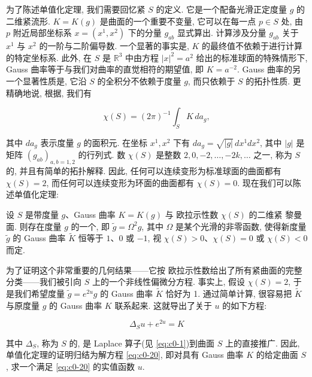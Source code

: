 为了陈述单值化定理, 我们需要回忆紧 $S$ 的定义.
它是一个配备光滑正定度量 $g$ 的二维紧流形.
 $K = K(g)$ 是曲面的一个重要不变量, 它可以在每一点 $p \in S$ 处, 由 $p$ 附近局部坐标系 $x = (x^{1}, x^{2})$ 下的分量 $g_{a b}$ 显式算出.
计算涉及分量 $g_{a b}$ 关于 $x^{1}$ 与 $x^{2}$ 的一阶与二阶偏导数.
一个显著的事实是, $K$ 的最终值不依赖于进行计算的特定坐标系.
此外, 在 $S$ 是 $\mathbb{R}^{3}$ 中由方程 $|x|^{2} = a^{2}$ 给出的标准球面的特殊情形下, Gauss 曲率等于与我们对曲率的直觉相符的期望值, 即 $K = a^{-2}$.
Gauss 曲率的另一个显著性质是, 它沿 $S$ 的全积分不依赖于度量 $g$, 而只依赖于 $S$ 的拓扑性质.
更精确地说, 根据, 我们有

\[
\chi(S) = (2 \pi)^{-1} \int_{S} K \, d a_{g},
\]

其中 $d a_{g}$ 表示度量 $g$ 的面积元.
在坐标 $x^{1}, x^{2}$ 下有 $d a_{g} = \sqrt{|g|}\, d x^{1} d x^{2}$, 其中 $|g|$ 是矩阵 $(g_{a b})_{a, b = 1, 2}$ 的行列式.
数 $\chi(S)$ 是整数 $2, 0, -2, \ldots, -2 k, \ldots$ 之一, 称为 $S$ 的, 并且有简单的拓扑解释.
因此, 任何可以连续变形为标准球面的曲面都有 $\chi(S) = 2$, 而任何可以连续变形为环面的曲面都有 $\chi(S) = 0$.
现在我们可以陈述单值化定理:

\begin{theorem}\label{thm:c0-1.1}
设 $S$ 是带度量 $g$、Gauss 曲率 $K = K(g)$ 与 欧拉示性数 $\chi(S)$ 的二维紧 黎曼面.
则存在度量 $g$ 的一个, 即 $\tilde{g} = \Omega^{2} g$, 其中 $\Omega$ 是某个光滑的非零函数, 使得新度量 $\tilde{g}$ 的 Gauss 曲率 $\tilde{K}$ 恒等于 $1$、$0$ 或 $-1$, 视 $\chi(S) > 0$、$\chi(S) = 0$ 或 $\chi(S) < 0$ 而定.
\end{theorem}

为了证明这个非常重要的几何结果——它按 欧拉示性数给出了所有紧曲面的完整分类——我们被引向 $S$ 上的一个非线性偏微分方程.
事实上, 假设 $\chi(S) = 2$, 于是我们希望度量 $\tilde{g} = e^{2 u} g$ 的 Gauss 曲率 $\tilde{K}$ 恰好为 1.
通过简单计算, 很容易把 $\tilde{K}$ 与原度量 $g$ 的 Gauss 曲率 $K$ 联系起来.
这就导出了关于 $u$ 的如下方程:

\begin{equation}\label{eq:c0-20}
\Delta_{S} u + e^{2 u} = K
\end{equation}

其中 $\Delta_{S}$, 称为 $S$ 的, 是 Laplace 算子(见 \eqref{eq:c0-1})到曲面 $S$ 上的直接推广.
因此, 单值化定理的证明归结为解方程 \eqref{eq:c0-20}, 即对具有 Gauss 曲率 $K$ 的给定曲面 $S$, 求一个满足 \eqref{eq:c0-20} 的实值函数 $u$.

